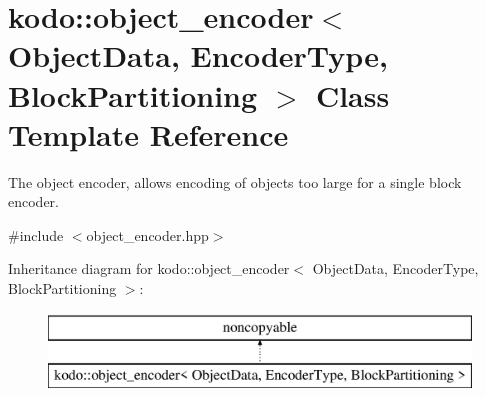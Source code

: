 \hypertarget{classkodo_1_1object__encoder}{\section{kodo\-:\-:object\-\_\-encoder$<$ Object\-Data, Encoder\-Type, Block\-Partitioning $>$ Class Template Reference}
\label{classkodo_1_1object__encoder}
}


The object encoder, allows encoding of objects too large for a single block encoder.  




{\ttfamily \#include $<$object\-\_\-encoder.\-hpp$>$}

Inheritance diagram for kodo\-:\-:object\-\_\-encoder$<$ Object\-Data, Encoder\-Type, Block\-Partitioning $>$\-:\begin{figure}[H]
\begin{center}
\leavevmode
\includegraphics[height=2.000000cm]{classkodo_1_1object__encoder}
\end{center}
\end{figure}
